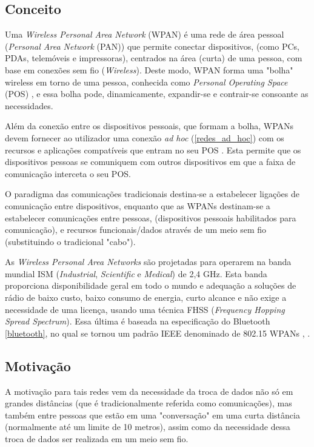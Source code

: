 \documentclass[conference]{IEEEtran}
\begin{document}
\subsection{Conceito}

Uma \textit{Wireless Personal Area Network} (WPAN) é uma rede de área pessoal (\textit{Personal Area Network} (PAN)) que permite conectar dispositivos, (como PCs, PDAs, telemóveis e impressoras), centrados na área (curta) de uma pessoa, com base em conexões sem fio (\textit{Wireless}). Deste modo, WPAN forma uma "bolha" wireless em torno de uma pessoa, conhecida como \textit{Personal Operating Space} (POS) \cite{prasad2004ofdm}, e essa bolha pode, dinamicamente, expandir-se e contrair-se consoante as necessidades.

Além da conexão entre os dispositivos pessoais, que formam a bolha, WPANs devem fornecer ao utilizador uma conexão \textit{ad hoc} (\ref{redes_ad_hoc}) com os recursos e aplicações compatíveis que entram no seu POS \cite{prasad2004ofdm}.
Esta permite que os dispositivos pessoas se comuniquem com outros dispositivos em que a faixa de comunicação interceta o seu POS.

O paradigma das comunicações tradicionais destina-se a estabelecer ligações de comunicação entre dispositivos, enquanto que as WPANs destinam-se a estabelecer comunicações entre pessoas, (dispositivos pessoais habilitados para comunicação), e recursos funcionais/dados através de um meio sem fio (substituindo o tradicional "cabo").

As \textit{Wireless Personal Area Networks} são projetadas para operarem na banda mundial ISM (\textit{Industrial}, \textit{Scientific} e \textit{Medical}) de 2,4 GHz. Esta banda proporciona disponibilidade geral em todo o mundo e adequação a soluções de rádio de baixo custo, baixo consumo de energia, curto alcance e não exige a necessidade de uma licença, usando uma técnica FHSS (\textit{Frequency Hopping Spread Spectrum}). Essa última é baseada na especificação do Bluetooth \ref{bluetooth}, no qual se tornou um padrão IEEE denominado de 802.15 WPANs \cite{marsan2002optimizing}, \cite{braley2000wireless}.


\subsection{Motivação}

A motivação para tais redes vem da necessidade da troca de dados não só em grandes distâncias (que é tradicionalmente referida como comunicações), mas também entre pessoas que estão em uma "conversação" em uma curta distância (normalmente até um limite de 10 metros), assim como da necessidade dessa troca de dados ser realizada em um meio sem fio.
\end{document}
